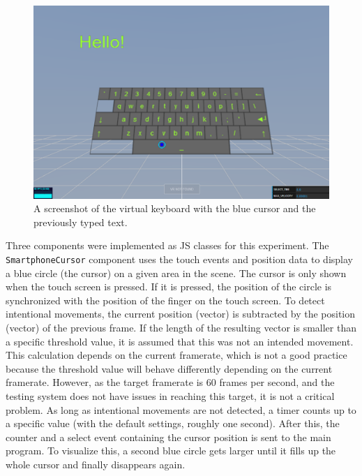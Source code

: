 \begin{figure}[H]
  \centering
  \includegraphics[width=12cm]{figures/implementation/screenshot_exp_vk.png}
  \caption[Screenshot of the virtual keyboard experiment]{A screenshot of the virtual keyboard with the blue cursor and the previously typed text.}\label{fig:screenshot-exp-vk}
\end{figure}

Three components were implemented as \acl{JS} classes for this experiment. The \lstinline{SmartphoneCursor} component uses the touch events and position data to display a blue circle (the cursor) on a given area in the scene. The cursor is only shown when the touch screen is pressed. If it is pressed, the position of the circle is synchronized with the position of the finger on the touch screen. To detect intentional movements, the current position (vector) is subtracted by the position (vector) of the previous frame. If the length of the resulting vector is smaller than a specific threshold value, it is assumed that this was not an intended movement. This calculation depends on the current framerate, which is not a good practice because the threshold value will behave differently depending on the current framerate. However, as the target framerate is 60 frames per second, and the testing system does not have issues in reaching this target, it is not a critical problem.
As long as intentional movements are not detected, a timer counts up to a specific value (with the default settings, roughly one second). After this, the counter and a select event containing the cursor position is sent to the main program. To visualize this, a second blue circle gets larger until it fills up the whole cursor and finally disappears again. 

